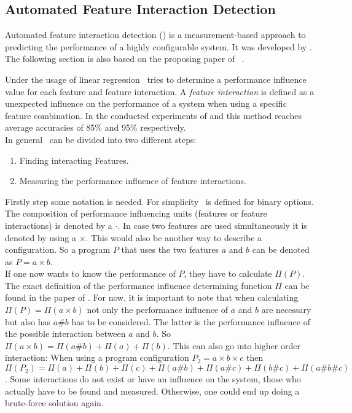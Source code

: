 

\subsection{Automated Feature Interaction Detection}\label{sec:AFID}

Automated feature interaction detection (\AFID) is a measurement-based approach to predicting the performance of a highly configurable system.
It was developed by \citet{AutomatedFeatureDetectionSiegmund2012}. The following section is also based on the proposing paper of \AFID~\cite{AutomatedFeatureDetectionSiegmund2012}. 

Under the usage of linear regression \AFID~tries to determine a performance influence value for each feature and feature interaction. A \textit{feature interaction} is defined as a unexpected influence on the performance of a system when using a specific feature combination.
In the conducted experiments of \citet{CostEfficientSampling_Gou_Siegmund_2015} and \citet{AutomatedFeatureDetectionSiegmund2012} this method reaches average accuracies of 85\% and 95\% respectively.
\\
\noindent
In general \AFID~can be divided into two different steps:
\begin{enumerate}
	\item Finding interacting Features.
	\item Measuring the performance influence of feature interactions.
\end{enumerate}
Firstly step some notation is needed. For simplicity \AFID~is defined for binary options.
The composition of performance influencing units (features or feature interactions) is denoted by a $\cdot$. In case two features are used simultaneously it is denoted by using a $\times$. This would also be another way to describe a configuration. So a program $P$ that uses the two features $a$ and $b$ can be denoted as $P= a \times b$.\\
If one now wants to know the performance of $P$, they have to calculate $\Pi(P)$. The exact definition of the performance influence determining function $\Pi$ can be found in the paper of \citet{AutomatedFeatureDetectionSiegmund2012}. For now, it is important to note that when calculating $\Pi(P)=\Pi(a \times b)$ not only the performance influence of $a$ and $b$ are necessary but also has $a\#b$ has to be considered. The latter is the performance influence of the possible interaction between $a$ and $b$. So $\Pi(a \times b) = \Pi(a\#b) + \Pi(a) + \Pi(b)$. This can also go into higher order interaction: When using a program configuration $P_2 = a \times b \times c$ then $\Pi(P_2) = \Pi(a) +  \Pi(b) +  \Pi(c) +  \Pi(a\#b) +  \Pi(a\#c) +  \Pi(b\#c) +  \Pi(a\#b\#c)$. Some interactions do not exist or have an influence on the system, those who actually have to be found and measured. Otherwise, one could end up doing a brute-force solution again.\\\\


